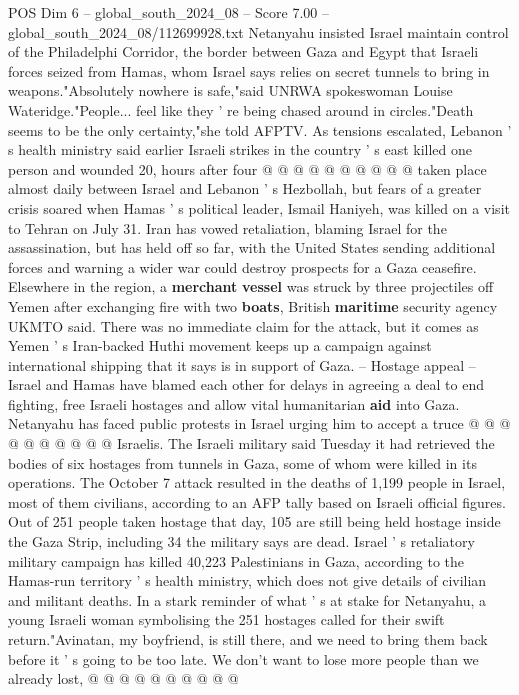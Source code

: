\begin{textsample}{POS Dim 6 – global\_south\_2024\_08 – Score 7.00 – global\_south\_2024\_08/112699928.txt}
Netanyahu insisted Israel maintain control of the Philadelphi Corridor, the border between Gaza and Egypt that Israeli forces seized from Hamas, whom Israel says relies on secret tunnels to bring in weapons."Absolutely nowhere is safe,"said UNRWA spokeswoman Louise Wateridge."People... feel like they ' re being chased around in circles."Death seems to be the only certainty,"she told AFPTV.
As tensions escalated, Lebanon ' s health ministry said earlier Israeli strikes in the country ' s east killed one person and wounded 20, hours after four @ @ @ @ @ @ @ @ @ @ taken place almost daily between Israel and Lebanon ' s Hezbollah, but fears of a greater crisis soared when Hamas ' s political leader, Ismail Haniyeh, was killed on a visit to Tehran on July 31.
Iran has vowed retaliation, blaming Israel for the assassination, but has held off so far, with the United States sending additional forces and warning a wider war could destroy prospects for a Gaza ceasefire.
Elsewhere in the region, a \textbf{merchant} \textbf{vessel} was struck by three projectiles off Yemen after exchanging fire with two \textbf{boats}, British \textbf{maritime} security agency UKMTO said.
There was no immediate claim for the attack, but it comes as Yemen ' s Iran-backed Huthi movement keeps up a campaign against international shipping that it says is in support of Gaza. -- Hostage appeal -- Israel and Hamas have blamed each other for delays in agreeing a deal to end fighting, free Israeli hostages and allow vital humanitarian \textbf{aid} into Gaza.
Netanyahu has faced public protests in Israel urging him to accept a truce @ @ @ @ @ @ @ @ @ @ Israelis.
The Israeli military said Tuesday it had retrieved the bodies of six hostages from tunnels in Gaza, some of whom were killed in its operations.
The October 7 attack resulted in the deaths of 1,199 people in Israel, most of them civilians, according to an AFP tally based on Israeli official figures.
Out of 251 people taken hostage that day, 105 are still being held hostage inside the Gaza Strip, including 34 the military says are dead.
Israel ' s retaliatory military campaign has killed 40,223 Palestinians in Gaza, according to the Hamas-run territory ' s health ministry, which does not give details of civilian and militant deaths.
In a stark reminder of what ' s at stake for Netanyahu, a young Israeli woman symbolising the 251 hostages called for their swift return."Avinatan, my boyfriend, is still there, and we need to bring them back before it ' s going to be too late.
We don't want to lose more people than we already lost, @ @ @ @ @ @ @ @ @ @

\end{textsample}
